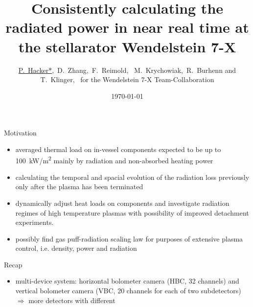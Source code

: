 \documentclass[final]{beamer}
\title{%
    Consistently calculating the radiated power in near real time at the %
    stellarator Wendelstein 7-X}%
\author[Author]%
    {\underline{P.~Hacker\inst{1,2}*},~D.~Zhang\inst{1},~F.~Reimold\inst{1},~%
     M.~Krychowiak\inst{1},~R.~Burhenn\inst{1} and T.~Klinger\inst{1},~%
     for the Wendelstein 7-X Team-Collaboration\inst{1}}
\institute[]{%
    \inst{1}%
        Max~Planck~Institute~for~Plasma~Physics,~Wendelsteinstr.~1,~%
        D-17491~Greifswald,~Germany,\\%
    \inst{2}%
        Ernst-Moritz-Arndt~University~Greifswald,~%
        Rubenowstr.~1,~D-17489~Greifswald,~Germany}
\date{\today}
\begin{document}
    \begin{frame}
        \frametitle{}
        \begin{minipage}[t]{0.30\textwidth}
            \vfill%
            \begin{kasten3}{\large%
                Motivation}\vspace*{0.5cm}\small{%
                \begin{itemize}%
                    \item{%
                        averaged thermal load on in-vessel components %
                        expected to be up to %
                        \mbox{\SI{100}{\kilo\watt/\square\meter}} mainly by %
                        radiation and non-absorbed heating power}%
                    \item{%
                        calculating the temporal and spacial evolution of %
                        the radiation loss previously only after the plasma %
                        has been terminated}
                    \item{%
                        dynamically adjust heat loads on components and %
                        investigate radiation regimes of high temperature %
                        plasmas with possibility of improved detachment %
                        experiments.}
                    \item{%
                        possibly find gas puff-radiation scaling law %
                        for purposes of extensive plasma control, i.e. %
                        density, power and radiation}
                \end{itemize}}\vspace*{0.5cm}%
            \end{kasten3}%
            \vspace*{0.7cm}%
            \begin{kasten}{\large%
                Recap}%
                \vspace*{0.5cm}%
                \large{{\color{ipp}}}%
                \vspace*{0.5cm}\small{%
                \begin{itemize}%
                    \item{%
                        multi-device system: horizontal bolometer camera %
                        (HBC, 32 channels) and vertical bolometer camera %
                        (VBC, 20 channels for each of two subdetectors)%
                        \newline$\Rightarrow$ more detectors with different %
}
\end{itemize}}
\end{kasten}
\end{minipage}
\end{frame}
\end{document}
